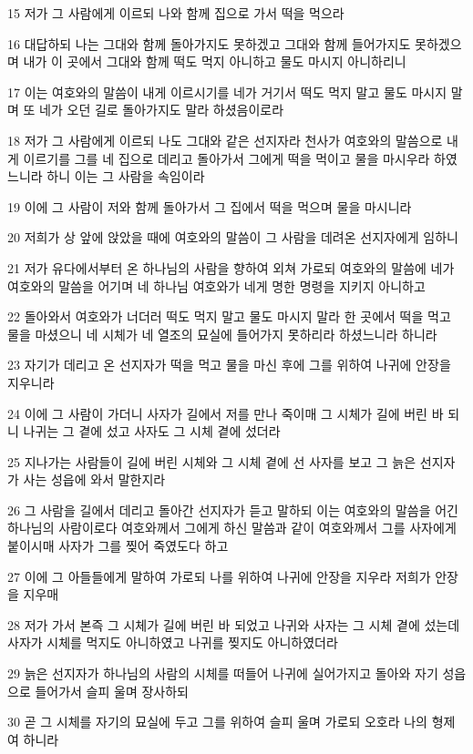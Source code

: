 \par 15 저가 그 사람에게 이르되 나와 함께 집으로 가서 떡을 먹으라
\par 16 대답하되 나는 그대와 함께 돌아가지도 못하겠고 그대와 함께 들어가지도 못하겠으며 내가 이 곳에서 그대와 함께 떡도 먹지 아니하고 물도 마시지 아니하리니
\par 17 이는 여호와의 말씀이 내게 이르시기를 네가 거기서 떡도 먹지 말고 물도 마시지 말며 또 네가 오던 길로 돌아가지도 말라 하셨음이로라
\par 18 저가 그 사람에게 이르되 나도 그대와 같은 선지자라 천사가 여호와의 말씀으로 내게 이르기를 그를 네 집으로 데리고 돌아가서 그에게 떡을 먹이고 물을 마시우라 하였느니라 하니 이는 그 사람을 속임이라
\par 19 이에 그 사람이 저와 함께 돌아가서 그 집에서 떡을 먹으며 물을 마시니라
\par 20 저희가 상 앞에 앉았을 때에 여호와의 말씀이 그 사람을 데려온 선지자에게 임하니
\par 21 저가 유다에서부터 온 하나님의 사람을 향하여 외쳐 가로되 여호와의 말씀에 네가 여호와의 말씀을 어기며 네 하나님 여호와가 네게 명한 명령을 지키지 아니하고
\par 22 돌아와서 여호와가 너더러 떡도 먹지 말고 물도 마시지 말라 한 곳에서 떡을 먹고 물을 마셨으니 네 시체가 네 열조의 묘실에 들어가지 못하리라 하셨느니라 하니라
\par 23 자기가 데리고 온 선지자가 떡을 먹고 물을 마신 후에 그를 위하여 나귀에 안장을 지우니라
\par 24 이에 그 사람이 가더니 사자가 길에서 저를 만나 죽이매 그 시체가 길에 버린 바 되니 나귀는 그 곁에 섰고 사자도 그 시체 곁에 섰더라
\par 25 지나가는 사람들이 길에 버린 시체와 그 시체 곁에 선 사자를 보고 그 늙은 선지자가 사는 성읍에 와서 말한지라
\par 26 그 사람을 길에서 데리고 돌아간 선지자가 듣고 말하되 이는 여호와의 말씀을 어긴 하나님의 사람이로다 여호와께서 그에게 하신 말씀과 같이 여호와께서 그를 사자에게 붙이시매 사자가 그를 찢어 죽였도다 하고
\par 27 이에 그 아들들에게 말하여 가로되 나를 위하여 나귀에 안장을 지우라 저희가 안장을 지우매
\par 28 저가 가서 본즉 그 시체가 길에 버린 바 되었고 나귀와 사자는 그 시체 곁에 섰는데 사자가 시체를 먹지도 아니하였고 나귀를 찢지도 아니하였더라
\par 29 늙은 선지자가 하나님의 사람의 시체를 떠들어 나귀에 실어가지고 돌아와 자기 성읍으로 들어가서 슬피 울며 장사하되
\par 30 곧 그 시체를 자기의 묘실에 두고 그를 위하여 슬피 울며 가로되 오호라 나의 형제여 하니라
